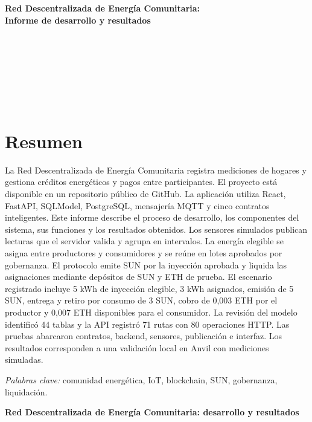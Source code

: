 \documentclass[12pt,letterpaper]{article}
\newcommand{\NombreProyecto}{Red Descentralizada de Energía Comunitaria}
\newcommand{\TituloInforme}{\NombreProyecto: desarrollo y resultados}
\begin{document}
\raggedright
\setlength{\parindent}{1.27cm}
\renewcommand{\tablename}{Tabla}
\thispagestyle{fancy}
\vspace*{1.3cm}
\begin{center}
\begin{minipage}{0.9\textwidth}
\centering
\textbf{\NombreProyecto:\\Informe de desarrollo y resultados}
\end{minipage}\par
\vspace{\baselineskip}
\AutorUno\\
\AutorDos\\
\AutorTres\\
\InstitucionAcademica\\
\AsignaturaInforme\\
\DocenteInforme\\
\FechaEntrega
\end{center}
\clearpage
\section*{Resumen}
\noindent La Red Descentralizada de Energía Comunitaria registra mediciones de hogares y gestiona créditos energéticos y pagos entre participantes. El proyecto está disponible en un repositorio público de GitHub. La aplicación utiliza React, FastAPI, SQLModel, PostgreSQL, mensajería MQTT y cinco contratos inteligentes. Este informe describe el proceso de desarrollo, los componentes del sistema, sus funciones y los resultados obtenidos. Los sensores simulados publican lecturas que el servidor valida y agrupa en intervalos. La energía elegible se asigna entre productores y consumidores y se reúne en lotes aprobados por gobernanza. El protocolo emite SUN por la inyección aprobada y liquida las asignaciones mediante depósitos de SUN y ETH de prueba. El escenario registrado incluye 5 kWh de inyección elegible, 3 kWh asignados, emisión de 5 SUN, entrega y retiro por consumo de 3 SUN, cobro de 0,003 ETH por el productor y 0,007 ETH disponibles para el consumidor. La revisión del modelo identificó 44 tablas y la API registró 71 rutas con 80 operaciones HTTP. Las pruebas abarcaron contratos, backend, sensores, publicación e interfaz. Los resultados corresponden a una validación local en Anvil con mediciones simuladas.
\par\noindent\textit{Palabras clave:} comunidad energética, IoT, blockchain, SUN, gobernanza, liquidación.
\clearpage
\begin{center}\textbf{\TituloInforme}\end{center}










\clearpage

\appendix

\end{document}
